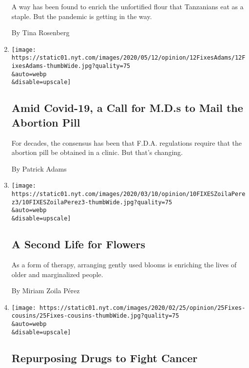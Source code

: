 \begin{enumerate}
  A way has been found to enrich the unfortified flour that Tanzanians
  eat as a staple. But the pandemic is getting in the way.

  By Tina Rosenberg
\item
  \href{/2020/05/12/opinion/covid-abortion-pill.html}{}

  \texttt{[image: https://static01.nyt.com/images/2020/05/12/opinion/12FixesAdams/12FixesAdams-thumbWide.jpg?quality=75\\\&auto=webp\\\&disable=upscale]}

  \hypertarget{amid-covid-19-a-call-for-mds-to-mail-the-abortion-pill}{%
  \subsection{Amid Covid-19, a Call for M.D.s to Mail the Abortion
  Pill}\label{amid-covid-19-a-call-for-mds-to-mail-the-abortion-pill}}

  For decades, the consensus has been that F.D.A. regulations require
  that the abortion pill be obtained in a clinic. But that's changing.

  By Patrick Adams
\item
  \href{/2020/03/10/opinion/second-life-flowers.html}{}

  \texttt{[image: https://static01.nyt.com/images/2020/03/10/opinion/10FIXESZoilaPerez3/10FIXESZoilaPerez3-thumbWide.jpg?quality=75\\\&auto=webp\\\&disable=upscale]}

  \hypertarget{a-second-life-for-flowers}{%
  \subsection{A Second Life for
  Flowers}\label{a-second-life-for-flowers}}

  As a form of therapy, arranging gently used blooms is enriching the
  lives of older and marginalized people.

  By Miriam Zoila Pérez
\item
  \href{/2020/02/25/opinion/repurposing-drugs-cancer.html}{}

  \texttt{[image: https://static01.nyt.com/images/2020/02/25/opinion/25Fixes-cousins/25Fixes-cousins-thumbWide.jpg?quality=75\\\&auto=webp\\\&disable=upscale]}

  \hypertarget{repurposing-drugs-to-fight-cancer}{%
  \subsection{Repurposing Drugs to Fight
  Cancer}\label{repurposing-drugs-to-fight-cancer}}


\end{enumerate}
